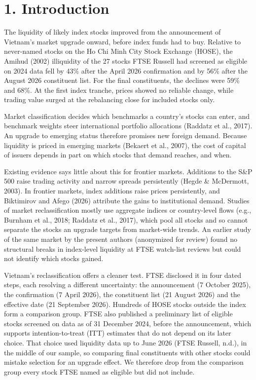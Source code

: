 \hypertarget{introduction}{%
\section{1. Introduction}\label{introduction}}

The liquidity of likely index stocks improved from the announcement of
Vietnam's market upgrade onward, before index funds had to buy. Relative
to never-named stocks on the Ho Chi Minh City Stock Exchange (HOSE), the
Amihud (2002) illiquidity of the 27 stocks FTSE Russell had screened as
eligible on 2024 data fell by 43\% after the April 2026 confirmation and
by 56\% after the August 2026 constituent list. For the final
constituents, the declines were 59\% and 68\%. At the first index
tranche, prices showed no reliable change, while trading value surged at
the rebalancing close for included stocks only.

Market classification decides which benchmarks a country's stocks can
enter, and benchmark weights steer international portfolio allocations
(Raddatz et al., 2017). An upgrade to emerging status therefore promises
new foreign demand. Because liquidity is priced in emerging markets
(Bekaert et al., 2007), the cost of capital of issuers depends in part
on which stocks that demand reaches, and when.

Existing evidence says little about this for frontier markets. Additions
to the S\&P 500 raise trading activity and narrow spreads persistently
(Hegde \& McDermott, 2003). In frontier markets, index additions raise
prices persistently, and Biktimirov and Afego (2026) attribute the gains
to institutional demand. Studies of market reclassification mostly use
aggregate indices or country-level flows (e.g., Burnham et al., 2018;
Raddatz et al., 2017), which pool all stocks and so cannot separate the
stocks an upgrade targets from market-wide trends. An earlier study of
the same market by the present authors (anonymized for review) found no
structural breaks in index-level liquidity at FTSE watch-list reviews
but could not identify which stocks gained.

Vietnam's reclassification offers a cleaner test. FTSE disclosed it in
four dated steps, each resolving a different uncertainty: the
announcement (7 October 2025), the confirmation (7 April 2026), the
constituent list (21 August 2026) and the effective date (21 September
2026). Hundreds of HOSE stocks outside the index form a comparison
group. FTSE also published a preliminary list of eligible stocks
screened on data as of 31 December 2024, before the announcement, which
supports intention-to-treat (ITT) estimates that do not depend on its
later choice. That choice used liquidity data up to June 2026 (FTSE
Russell, n.d.), in the middle of our sample, so comparing final
constituents with other stocks could mistake selection for an upgrade
effect. We therefore drop from the comparison group every stock FTSE
named as eligible but did not include.

